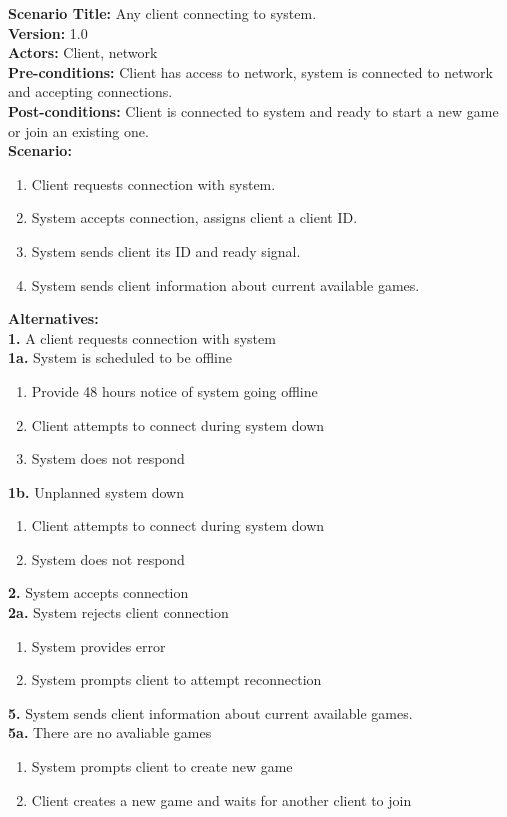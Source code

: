 \documentclass[letterpaper,12pt]{article}
\begin{document}
\noindent \textbf{Scenario Title:} Any client connecting to system.\\
\textbf{Version:} 1.0\\
\textbf{Actors:} Client, network\\
\textbf{Pre-conditions:} Client has access to network, system is connected to network and accepting connections.\\
\textbf{Post-conditions:} Client is connected to system and ready to start a new game or join an existing one.\\
\textbf{Scenario:}
\begin{enumerate}
   \item Client requests connection with system.
   \item System accepts connection, assigns client a client ID.
   \item System sends client its ID and ready signal.
   \item System sends client information about current available games.
\end{enumerate}
\textbf{Alternatives:}\\
\textbf{1.} A client requests connection with system\\
\textbf{1a.} System is scheduled to be offline
\begin{enumerate}
\item Provide 48 hours notice of system going offline
\item Client attempts to connect during system down
\item System does not respond
\end{enumerate}
\textbf{1b.} Unplanned system down
\begin{enumerate}
\item Client attempts to connect during system down
\item System does not respond
\end{enumerate}
\textbf{2.} System accepts connection\\
\textbf{2a.} System rejects client connection
\begin{enumerate}
\item System provides error
\item System prompts client to attempt reconnection
\end{enumerate}
\textbf{5.} System sends client information about current available games.\\
\textbf{5a.} There are no avaliable games
\begin{enumerate}
\item System prompts client to create new game
\item Client creates a new game and waits for another client to join
\end{enumerate}
\end{document}
